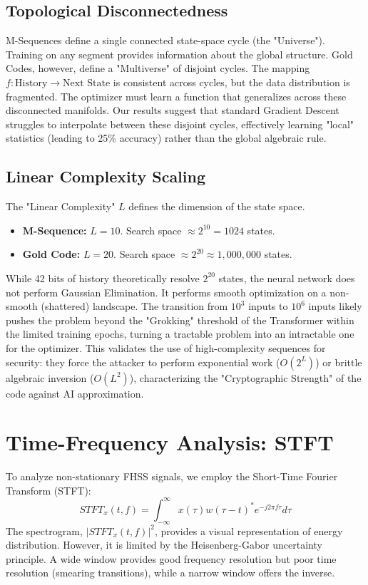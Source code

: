 \documentclass[12pt,a4paper]{report}
\theoremstyle{plain}
\begin{document}
\subsection{Topological Disconnectedness}
M-Sequences define a single connected state-space cycle (the "Universe"). Training on any segment provides information about the global structure.
Gold Codes, however, define a "Multiverse" of disjoint cycles. The mapping $f: \text{History} \to \text{Next State}$ is consistent across cycles, but the data distribution is fragmented. The optimizer must learn a function that generalizes across these disconnected manifolds. Our results suggest that standard Gradient Descent struggles to interpolate between these disjoint cycles, effectively learning "local" statistics (leading to 25\% accuracy) rather than the global algebraic rule.

\subsection{Linear Complexity Scaling}
The "Linear Complexity" $L$ defines the dimension of the state space.
\begin{itemize}
    \item \textbf{M-Sequence:} $L=10$. Search space $\approx 2^{10} = 1024$ states.
    \item \textbf{Gold Code:} $L=20$. Search space $\approx 2^{20} \approx 1,000,000$ states.
\end{itemize}
While 42 bits of history theoretically resolve $2^{20}$ states, the neural network does not perform Gaussian Elimination. It performs smooth optimization on a non-smooth (shattered) landscape. The transition from $10^{3}$ inputs to $10^{6}$ inputs likely pushes the problem beyond the "Grokking" threshold of the Transformer within the limited training epochs, turning a tractable problem into an intractable one for the optimizer. This validates the use of high-complexity sequences for security: they force the attacker to perform exponential work ($O(2^L)$) or brittle algebraic inversion ($O(L^2)$), characterizing the "Cryptographic Strength" of the code against AI approximation.


\section{Time-Frequency Analysis: STFT}
To analyze non-stationary FHSS signals, we employ the Short-Time Fourier Transform (STFT):
\begin{equation}
    STFT_{x}(t,f)=\int_{-\infty}^{\infty}x(\tau)w(\tau-t)^{*}e^{-j2\pi f\tau}d\tau
\end{equation}
The spectrogram, $|STFT_{x}(t,f)|^{2}$, provides a visual representation of energy distribution. However, it is limited by the Heisenberg-Gabor uncertainty principle. A wide window provides good frequency resolution but poor time resolution (smearing transitions), while a narrow window offers the inverse.
\end{document}
